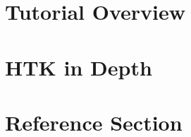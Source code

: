 \documentclass[a4paper,oneside]{book}
\begin{document}
\newpage
\tableofcontents

\newpage
\pagestyle{myheadings}

\part{Tutorial Overview}




\part{HTK in Depth}











\part{Reference Section}
























   
\clearpage
{}
\printindex
\end{document}
